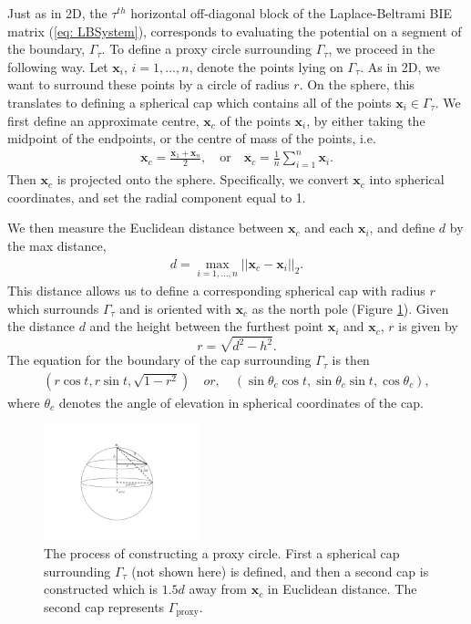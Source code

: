 \documentclass{sfuthesis}
\begin{document}
Just as in 2D, the $\tau^{th}$ horizontal off-diagonal block of the Laplace-Beltrami BIE matrix (\ref{eq: LBSystem}), corresponds to evaluating the potential on a segment of the boundary, $\Gamma_\tau$. To define a proxy circle surrounding $\Gamma_\tau$, we proceed in the following way. 
Let $\mathbf{x}_i$, $i=1,...,n$, denote the points lying on $\Gamma_\tau$. As in 2D, we want to surround these points by a circle of radius $r$. On the sphere, this translates to defining a spherical cap which contains all of the points $\mathbf{x}_i \in \Gamma_\tau$. We first define an approximate centre, $\mathbf{x}_c$ of the points $\mathbf{x}_i$, by either taking the midpoint of the endpoints, or the centre of mass of the points, i.e.
\begin{align*}
	\mathbf{x}_c=\frac{\mathbf{x}_1+\mathbf{x}_n}{2}, \quad  \text{or}  \quad  \mathbf{x}_c=\frac{1}{n}\sum_{i=1}^n \mathbf{x}_i.
\end{align*}
Then $\mathbf{x}_c$ is projected onto the sphere. Specifically, we convert $\mathbf{x}_c$ into spherical coordinates, and set the radial component equal to 1. 

We then measure the Euclidean distance between $\mathbf{x}_c$ and each $\mathbf{x}_i$, and define $d$ by the max distance, 
\begin{align*}
	d=\max_{i=1,...,n}{||\mathbf{x}_c-\mathbf{x}_i||}_2.
\end{align*}
This distance allows us to define a corresponding spherical cap with radius $r$ which surrounds $\Gamma_\tau$ and is oriented with $\mathbf{x}_c$ as the north pole (Figure \ref{fig: caps}). Given the distance $d$ and the height between the furthest point $\mathbf{x}_i$ and $\mathbf{x}_c$, $r$ is given by 
	\[r=\sqrt{d^2-h^2}.\]
The equation for the boundary of the cap surrounding $\Gamma_\tau$ is then  
\begin{align*}
	(r \cos t, r \sin t, \sqrt{1-r^2}) \quad or, \quad (\sin \theta_c \cos t, \sin \theta_c \sin t, \cos \theta_c), 
\end{align*}
where $\theta_c$ denotes the angle of elevation in spherical coordinates of the cap. 

\begin{figure}[h]
	\centering
  	\includegraphics[width=0.4\textwidth]{ProxyCircleSphere}
  	\caption{The process of constructing a proxy circle. First a spherical cap surrounding $\Gamma_\tau$ (not shown here) is defined, and then a second cap is constructed which is $1.5d$ away from $\mathbf{x}_c$ in Euclidean distance. The second cap represents $\Gamma_{\text{proxy}}$.}
  	\label{fig: caps}
\end{figure}
\end{document}
